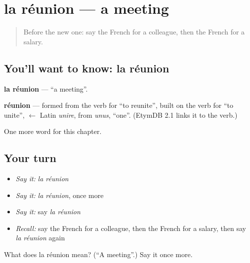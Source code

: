 \section[la réunion]{la réunion — a meeting}

\label{lesson:FR-C174-reunion}



\begin{quote}
Before the new one: say the French for a colleague, then the French for a salary.
\end{quote}

\subsection*{You'll want to know: la réunion}
\textbf{la réunion} — \textquotedblleft{}a meeting\textquotedblright{}.

\begin{cousinweb}
\textbf{réunion} — formed from the verb for \textquotedblleft{}to reunite\textquotedblright{}, built on the verb for \textquotedblleft{}to unite\textquotedblright{}, $\leftarrow$ Latin \emph{unire}, from \emph{unus}, \textquotedblleft{}one\textquotedblright{}. (EtymDB 2.1 links it to the verb.)
\end{cousinweb}

\begin{grammarlens}[title={What you've built}]
One more word for this chapter.
\end{grammarlens}

\subsection*{Your turn}
\begin{itemize}
\raggedright
  \item \emph{Say it:} \emph{la réunion}
  \item \emph{Say it:} \emph{la réunion}, once more
  \item \emph{Say it:} say \emph{la réunion}
  \item \emph{Recall:} say the French for a colleague, then the French for a salary, then say \emph{la réunion} again
\end{itemize}

\begin{tcolorbox}[breakable,colback=teal!4,colframe=teal!35!black,title={Before you move on}]
What does la réunion mean? (\textquotedblleft{}A meeting\textquotedblright{}.) Say it once more.
\end{tcolorbox}
